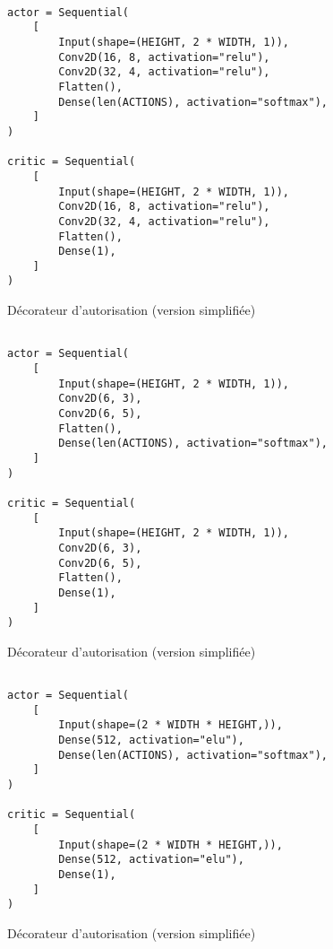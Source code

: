 
\renewcommand{\theFancyVerbLine}{
    \textcolor{mylinenumbercolor}{\ttfamily\arabic{FancyVerbLine}} %
}

\begin{figure}[!ht]
\centering
\begin{verbatim}

actor = Sequential(
    [
        Input(shape=(HEIGHT, 2 * WIDTH, 1)),
        Conv2D(16, 8, activation="relu"),
        Conv2D(32, 4, activation="relu"),
        Flatten(),
        Dense(len(ACTIONS), activation="softmax"),
    ]
)

critic = Sequential(
    [
        Input(shape=(HEIGHT, 2 * WIDTH, 1)),
        Conv2D(16, 8, activation="relu"),
        Conv2D(32, 4, activation="relu"),
        Flatten(),
        Dense(1),
    ]
)

\end{verbatim}
\caption{Décorateur d'autorisation (version simplifiée)}
\label{fig:decorator}
\end{figure}

\begin{figure}[!ht]
\centering
\begin{verbatim}

actor = Sequential(
    [
        Input(shape=(HEIGHT, 2 * WIDTH, 1)),
        Conv2D(6, 3),
        Conv2D(6, 5),
        Flatten(),
        Dense(len(ACTIONS), activation="softmax"),
    ]
)

critic = Sequential(
    [
        Input(shape=(HEIGHT, 2 * WIDTH, 1)),
        Conv2D(6, 3),
        Conv2D(6, 5),
        Flatten(),
        Dense(1),
    ]
)

\end{verbatim}
\caption{Décorateur d'autorisation (version simplifiée)}
\label{fig:decorator}
\end{figure}


\begin{figure}[!ht]
\centering
\begin{verbatim}

actor = Sequential(
    [
        Input(shape=(2 * WIDTH * HEIGHT,)),
        Dense(512, activation="elu"),
        Dense(len(ACTIONS), activation="softmax"),
    ]
)

critic = Sequential(
    [
        Input(shape=(2 * WIDTH * HEIGHT,)),
        Dense(512, activation="elu"),
        Dense(1),
    ]
)

\end{verbatim}
\caption{Décorateur d'autorisation (version simplifiée)}
\label{fig:decorator}
\end{figure}

